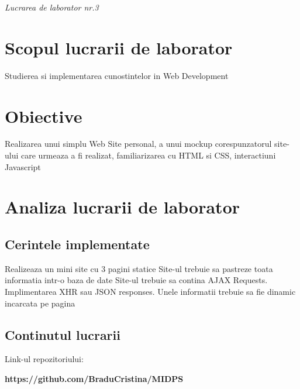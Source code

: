 \documentclass[11pt]{article}
\begin{document}
\begin{LARGE}
\textit{Lucrarea de laborator nr.3}
\end{LARGE}

\section{Scopul lucrarii de laborator}

Studierea si implementarea cunostintelor in Web Development

\section{Obiective}

Realizarea unui simplu Web Site personal, a unui mockup corespunzatorul site-ului care urmeaza a fi realizat, familiarizarea cu HTML si CSS, interactiuni Javascript

\section{Analiza lucrarii de laborator}

\subsection{Cerintele implementate}

Realizeaza un mini site cu 3 pagini statice
Site-ul trebuie sa pastreze toata informatia intr-o baza de date
Site-ul trebuie sa contina AJAX Requests.
Implimentarea XHR sau JSON responses. Unele informatii trebuie sa fie dinamic incarcata pe pagina


\subsection{Continutul lucrarii}
Link-ul repozitoriului: 
\begin{center}
\textbf{https://github.com/BraduCristina/MIDPS}
\end{center}
\end{document}
